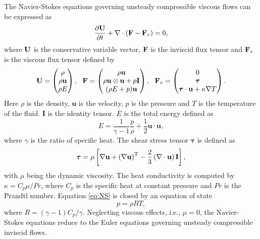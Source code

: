The Navier-Stokes equations governing unsteady compressible viscous flows can be expressed as
\begin{equation}
    \label{eq:NS}
    \dfrac{\partial \mathbf{U}}{\partial t} +
    \nabla \cdot (\mathbf{F} - \mathbf{F}_v)= 0,
\end{equation}
where $\mathbf{U}$ is the conservative variable vector, $\mathbf{F}$ is the inviscid flux tensor and $\mathbf{F}_v$
is the viscous flux tensor defined by
\begin{equation}
	\mathbf{U} = \begin{pmatrix}
		\rho \\ \rho \mathbf{u} \\ \rho E
	\end{pmatrix},\ \
	\mathbf{F}= \begin{pmatrix}
		\rho \mathbf{u}                \\
		\rho \mathbf{u}\otimes \mathbf{u}+p \mathbf{I}\\
		(\rho E+p)\mathbf{u}                  \\
	\end{pmatrix},\ \
	\mathbf{F}_{v} = \begin{pmatrix}
		0                                \\
		\boldsymbol{\tau}\\
	 	\boldsymbol{\tau} \cdot \mathbf{u} + \kappa \nabla T \\
	\end{pmatrix}.
\end{equation}
Here $\rho$ is the density, $\mathbf{u}$ is the velocity, $p$ is the pressure and $T$ is the temperature of the fluid. $\mathbf{I}$ is the identity tensor. $E$ is the total energy defined as
\begin{equation}
		E = \dfrac{1}{\gamma-1} \dfrac{p}{\rho} + \frac{1}{2} \mathbf{u} \cdot \mathbf{u},
\end{equation}
where $\gamma$ is the ratio of specific heat. The shear stress tensor $\boldsymbol{\tau}$ is defined as 
\begin{equation}
	\boldsymbol{\tau}= \mu \left[ \nabla \mathbf{u} + \left(\nabla \mathbf{u}\right)^\mathrm{T} - \frac{2}{3} \left(\nabla \cdot \mathbf{u}\right) \mathbf{I} \right],
\end{equation}
with $\mu$ being the dynamic viscosity. The heat conductivity is computed by $\kappa=C_p \mu /Pr$, where $C_p$ is the specific heat at constant pressure and $Pr$ is the Prandtl number. Equation \eqref{eq:NS} is closed by an equation of state
\begin{equation}
	p= \rho R T,
\end{equation}
where $R= \left(\gamma-1\right) C_p/\gamma$.
Neglecting viscous effects, i.e., $\mu=0$, the Navier-Stokes equations reduce to the Euler equations governing unsteady compressible inviscid flows.

